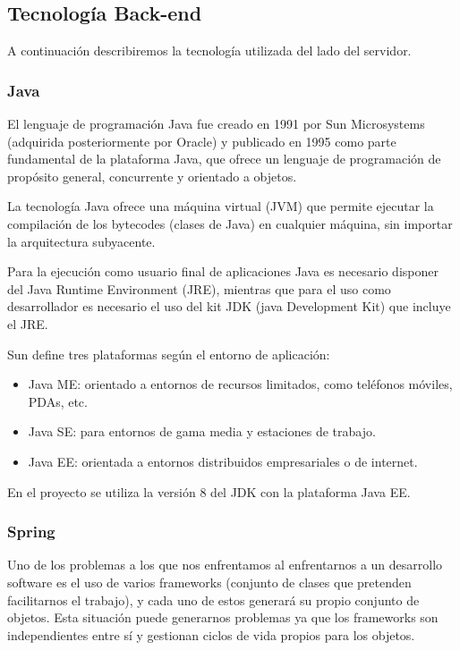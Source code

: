 \subsection{Tecnología Back-end}
A continuación describiremos la tecnología utilizada del lado del servidor.

\subsubsection{Java}

El lenguaje de programación Java fue creado en 1991 por Sun Microsystems (adquirida posteriormente por Oracle) y publicado en 1995 como parte fundamental de la plataforma Java, que ofrece un lenguaje de programación de propósito general, concurrente y orientado a objetos.

La tecnología Java ofrece una máquina virtual (JVM) que permite ejecutar la compilación de los bytecodes (clases de Java) en cualquier máquina, sin importar la arquitectura subyacente.

Para la ejecución como usuario final de aplicaciones Java es necesario disponer del Java Runtime Environment (JRE), mientras que para el uso como desarrollador es necesario el uso del kit JDK (java Development Kit) que incluye el JRE.

Sun define tres plataformas según el entorno de aplicación:
\begin{itemize}
	\item Java ME: orientado a entornos de recursos limitados, como teléfonos móviles, PDAs, etc.
	\item Java SE: para entornos de gama media y estaciones de trabajo.
	\item Java EE: orientada a entornos distribuidos empresariales o de internet.
\end{itemize}

En el proyecto se utiliza la versión 8 del JDK con la plataforma Java EE.

\subsubsection{Spring}

Uno de los problemas a los que nos enfrentamos al enfrentarnos a un desarrollo software es el uso de varios frameworks (conjunto de clases que pretenden facilitarnos el trabajo), y cada uno de estos generará su propio conjunto de objetos. Esta situación puede generarnos problemas ya que los frameworks son independientes entre sí y gestionan ciclos de vida propios para los objetos.

